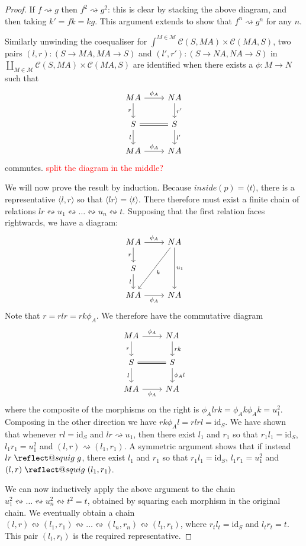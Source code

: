 \documentclass[11pt,a4paper]{article}
\makeatletter
\theoremstyle{plain}
\theoremstyle{definition}
\newcommand{\C}{\mathscr{C}}
\newcommand{\M}{\mathscr{M}}
\newcommand{\id}{\mathrm{id}}
\providecommand{\leftsquigarrow}{%
  \mathrel{\mathpalette\reflect@squig\relax}%
}
\newcommand{\reflect@squig}[2]{%
  \reflectbox{$\m@th#1\rightsquigarrow$}%
}
\newcommand{\todo}[1]{\textcolor{red}{\small #1}}
\makeatother
\begin{document}
\begin{proof}
If $f \rightsquigarrow g$ then $f^2 \rightsquigarrow g^2$: this is clear by stacking the above diagram, and then taking $k' = fk = kg$. This argument extends to show that $f^n \rightsquigarrow g^n$ for any $n$.

Similarly unwinding the coequaliser for $\int^{M \in \M} \C(S, M A) \times \C(M A, S)$, two pairs $(l, r) : (S \to M A, MA \to S)$ and $(l', r') : (S \to NA, NA \to S)$ in $\coprod_{M \in \M} \C(S, M A) \times \C(M A, S)$ are identified when there exists a $\phi : M \to N$ such that
\[
\begin{tikzcd}
M A \ar[r, "\phi_A"] \ar[d, "r", swap] & N A \ar[d, "r'"] \\
S \ar[r, equal] \ar[d, "l", swap] & S \ar[d, "l'"]  \\
MA \ar[r, "\phi_A"] & N A
\end{tikzcd}
\]
commutes. \todo{split the diagram in the middle?}

We will now prove the result by induction. Because $inside(p) = \langle t \rangle$, there is a representative $\langle l, r \rangle$ so that $\langle lr \rangle = \langle t \rangle$. There therefore must exist a finite chain of relations $lr \leftrightsquigarrow u_1 \leftrightsquigarrow \dots \leftrightsquigarrow u_n \leftrightsquigarrow t$.
Supposing that the first relation faces rightwards, we have a diagram:
\[
\begin{tikzcd}
M A \ar[r, "\phi_A"] \ar[d, "r", swap] & N A \ar[dd, "u_1"] \ar[ddl, "k"] \\
S \ar[d,"l",swap] & \\
M A \ar[r, "\phi_A", swap] & N A
\end{tikzcd}
\]
Note that $r = rlr = rk\phi_A$. We therefore have the commutative diagram
\[
\begin{tikzcd}
M A \ar[r, "\phi_A"] \ar[d, "r", swap] & N A \ar[d, "rk"] \\
S \ar[r, equal] \ar[d, "l", swap] & S \ar[d, "\phi_Al"] \\
MA \ar[r, "\phi_A", swap] & N A
\end{tikzcd}
\]
where the composite of the morphisms on the right is $\phi_A l r k = \phi_A k \phi_A k = u_1^2$. Composing in the other direction we have $r k \phi_A l = rlrl = \id_S$. We have shown that whenever $rl = \id_S$ and $lr \rightsquigarrow u_1$, then there exist $l_1$ and $r_1$ so that $r_1l_1 = \id_S$, $l_1r_1 = u_1^2$ and $(l, r) \rightsquigarrow (l_1, r_1)$. A symmetric argument shows that if instead $lr \leftsquigarrow g$, there exist $l_1$ and $r_1$ so that $r_1l_1 = \id_S$, $l_1r_1 = u_1^2$ and $(l, r) \leftsquigarrow (l_1, r_1)$.

We can now inductively apply the above argument to the chain $u_1^2 \leftrightsquigarrow \dots \leftrightsquigarrow u_n^2 \leftrightsquigarrow t^2 = t$, obtained by squaring each morphism in the original chain. We eventually obtain a chain $(l, r) \leftrightsquigarrow (l_1, r_1)\leftrightsquigarrow \dots \leftrightsquigarrow (l_n, r_n) \leftrightsquigarrow (l_t, r_t)$, where $r_tl_t = \id_S$ and $l_t r_t = t$. This pair $(l_t, r_t)$ is the required representative.
\end{proof}
\end{document}
